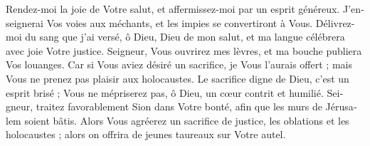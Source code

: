 {Ren­dez-moi la joie de Votre salut, et affer­mis­sez-moi par un esprit géné­reux.}
{J’en­sei­gne­rai Vos voies aux méchants, et les impies se conver­ti­ront à Vous.}
{Déli­vrez-moi du sang que j’ai versé, ô Dieu, Dieu de mon salut, et ma langue célé­brera avec joie Votre jus­tice.}
{Sei­gneur, Vous ouvri­rez mes lèvres, et ma bouche publiera Vos louanges.}
{Car si Vous aviez désiré un sacri­fice, je Vous l’au­rais offert ; mais Vous ne pre­nez pas plai­sir aux holo­caustes.}
{Le sacri­fice digne de Dieu, c’est un esprit brisé ; Vous ne mépri­se­rez pas, ô Dieu, un cœur contrit et humi­lié.}
{Sei­gneur, trai­tez favo­ra­ble­ment Sion dans Votre bonté, afin que les murs de Jéru­sa­lem soient bâtis.}
{Alors Vous agrée­rez un sacri­fice de jus­tice, les obla­tions et les holo­caustes ; alors on offrira de jeunes tau­reaux sur Votre autel.}